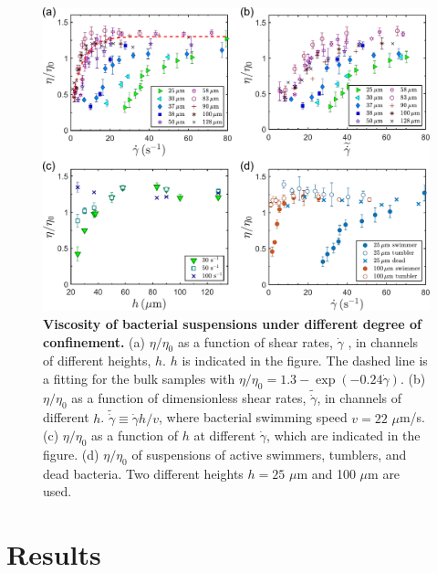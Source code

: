 \begin{figure}[!ht]
	\begin{center}
	\includegraphics[width=5.5 in]{Figs/3-Rheo/2.pdf}
	\end{center}
	\caption[Viscosity of Bacterial Suspensions under Different Degree of Confinement]
	{
	\textbf{Viscosity of bacterial suspensions under different degree of confinement.}
  (a) $\eta/\eta_0$ as a function of shear rates, $\dot\gamma$ , in channels of different heights, $h$. $h$ is indicated in the figure. The dashed line is a fitting for the bulk samples with $\eta/\eta_0=1.3-\exp(-0.24\dot\gamma)$. (b) $\eta/\eta_0$ as a function of dimensionless shear rates, $\tilde{\dot\gamma}$, in channels of different $h$. $\tilde{\dot\gamma}\equiv\dot\gamma h/v$, where bacterial swimming speed $v = 22$ $\mu$m/s.
  (c) $\eta/\eta_0$ as a function of $h$ at different $\dot\gamma$, which are indicated in the figure.
  (d) $\eta/\eta_0$ of suspensions of active swimmers, tumblers, and dead bacteria. Two different heights $h = 25$ $\mu$m and 100 $\mu$m are used.
	}
	\label{fig:3-rheology}
\end{figure}

\section{Results}
